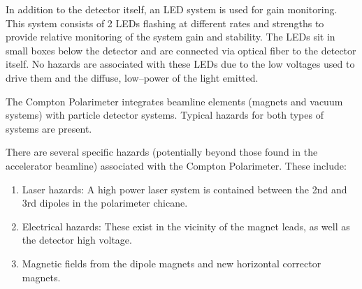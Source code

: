 {In addition to the detector itself, an LED system is used for gain monitoring. This system consists of 2 LEDs flashing
at different rates and strengths to provide relative monitoring of the system gain and stability. The LEDs sit in
small boxes below the detector and are connected via optical fiber to the detector itself. No hazards are associated
with these LEDs due to the low voltages used to drive them and the diffuse, low--power of the light emitted.



\begin{safetyen}{0}{0}
%
%

The Compton Polarimeter integrates beamline elements (magnets and vacuum systems) with
particle detector systems. Typical hazards for both types of systems are present.


There are several specific hazards (potentially beyond those found in the accelerator beamline)
associated with the Compton Polarimeter.  These include:
\begin{enumerate}
\item{Laser hazards: A high power laser system is contained between the 2nd and 3rd dipoles in the polarimeter chicane.}
\item{Electrical hazards: These exist in the vicinity of the magnet leads, as well as the detector high
voltage.}
\item{Magnetic fields from the dipole magnets and new horizontal corrector magnets.}
\end{enumerate}



\end{safetyen}}
